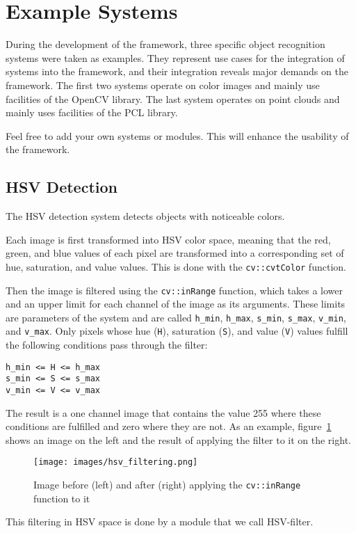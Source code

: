 \documentclass{article}
\newcommand{\code}[1]{\texttt{#1}}
\begin{document}
\section{Example Systems}

During the development of the framework,
three specific object recognition systems were taken as examples.
They represent use cases for the integration of systems into the framework,
and their integration reveals major demands on the framework.
The first two systems operate on color images
and mainly use facilities of the OpenCV library.
The last system operates on point clouds and mainly uses facilities
of the PCL library.

Feel free to add your own systems or modules.
This will enhance the usability of the framework.


\subsection{HSV Detection}
\label{sec:hsv_det}
The HSV detection system detects objects with noticeable colors.

Each image is first transformed into HSV color space,
meaning that the red, green, and blue values of each pixel are transformed into a
corresponding set of hue, saturation, and value values.
This is done with the \code{cv::cvtColor} function.

Then the image is filtered using the \code{cv::inRange} function,
which takes a lower and an upper limit for each channel of the image as its arguments.
These limits are parameters of the system and are called \code{h\_min}, \code{h\_max},
\code{s\_min}, \code{s\_max}, \code{v\_min}, and \code{v\_max}.
Only pixels whose hue (\code{H}), saturation (\code{S}), and value (\code{V}) values
fulfill the following conditions pass through the filter:
\begin{lstlisting}
h_min <= H <= h_max
s_min <= S <= s_max
v_min <= V <= v_max
\end{lstlisting}
The result is a one channel image that contains the value 255
where these conditions are fulfilled
and zero where they are not.
As an example, figure~\ref{fig:hsv_filtering} shows an image on the left
and the result of applying the filter to it on the right.
\begin{figure}
	\centering
	\texttt{[image: images/hsv\_filtering.png]}
	\caption{Image before (left) and after (right) applying the \code{cv::inRange} function to it}
	\label{fig:hsv_filtering}
\end{figure}
This filtering in HSV space is done by a module that we call HSV-filter.
\end{document}
